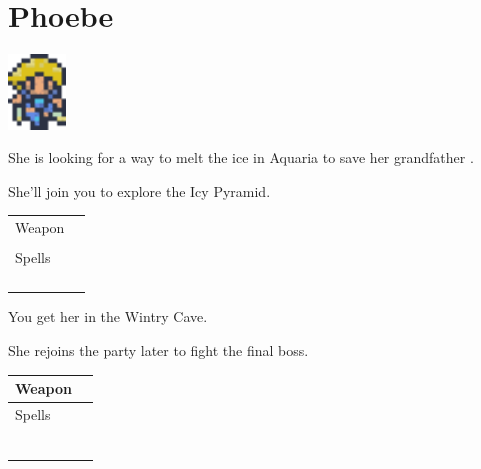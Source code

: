 \section{Phoebe}
\label{char:phoebe}

\includegraphics[height=2cm,keepaspectratio]{./resources/chars/phoebe}

She is looking for a way to melt the ice in Aquaria to save her grandfather .

She’ll join you to explore the Icy Pyramid.

\vspace{0.5em}
\begin{tabular}{ l | l }
	Weapon & \nameref{weapon:cat_claw} \\
	& \nameref{weapon:bow_of_grace} \\
	\hline
	Spells & \nameref{spell:cure} \\
	& \nameref{spell:heal} \\
	& \nameref{spell:life} \\
	& \nameref{spell:fire} \\
	& \nameref{spell:thunder}
\end{tabular}
\vspace{0.5em}

You get her  in the Wintry Cave.

\vspace{1em}

She rejoins the party later to fight the final boss.

\vspace{0.5em}
\begin{tabular}{ l | l }
	Weapon & \nameref{weapon:bow_of_grace} \\
	\hline
	Spells & \nameref{spell:cure} \\
	& \nameref{spell:heal} \\
	& \nameref{spell:life} \\
	& \nameref{spell:blizzard} \\
	& \nameref{spell:fire} \\
	& \nameref{spell:thunder} \\
	& \nameref{spell:white}
\end{tabular}
\vspace{0.5em}
